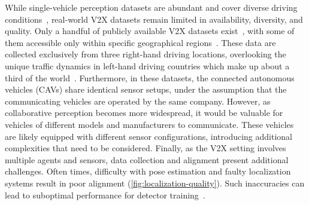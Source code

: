 

While single-vehicle perception datasets are abundant and cover diverse driving conditions~\citep{kitti,lyft,waymo,nuscenes,argoverse,once,ithaca365,pandaset,apolloscape,oxfordrobotcar,cadc}, real-world V2X datasets remain limited in availability, diversity, and quality. Only a handful of publicly available V2X datasets exist~\citep{yu2022dair,yu2023v2x,
xu2023v2v4real,xiang2024v2x,zimmer2024tumtraf}, with some of them accessible only within specific geographical regions~\citep{yu2022dair,yu2023v2x}. These data are collected exclusively from three right-hand driving locations, overlooking the unique traffic dynamics in left-hand driving countries which make up about a third of the world~\citep{xu2023left}. Furthermore, in these datasets, the connected autonomous vehicles (CAVs) share identical \lidar sensor setups, under the assumption that the communicating vehicles are operated by the same company. However, as collaborative perception becomes more widespread, it would be valuable for vehicles of different models and manufacturers to communicate. These vehicles are likely equipped with different sensor configurations, introducing additional complexities that need to be considered. Finally, as the V2X setting involves multiple agents and sensors, data collection and alignment present additional challenges. 
Often times, difficulty with pose estimation and faulty localization systems result in poor alignment (\autoref{fig:localization-quality}). 
Such inaccuracies can lead to suboptimal performance for detector training~\citep{xu2022v2x}.

